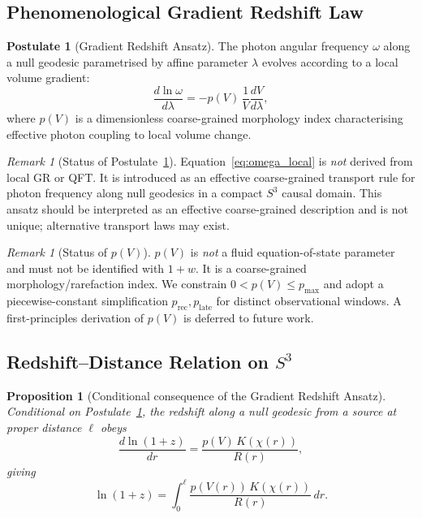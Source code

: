 \documentclass[12pt,a4paper]{amsart}
\theoremstyle{plain}
\newtheorem{proposition}[theorem]{Proposition}
\theoremstyle{definition}
\newtheorem{postulate}[theorem]{Postulate}
\theoremstyle{remark}
\newtheorem{remark}[theorem]{Remark}
\newcommand{\Sthree}{S^3}
\begin{document}
\subsection{Phenomenological Gradient Redshift Law}

\begin{postulate}[Gradient Redshift Ansatz]
  \label{post:gradient}
  The photon angular frequency $\omega$ along a null geodesic
  parametrised by affine parameter $\lambda$ evolves according to a
  local volume gradient:
  \begin{equation}
    \frac{d\ln\omega}{d\lambda} = -p(V)\,\frac{1}{V}\frac{dV}{d\lambda},
    \label{eq:omega_local}
  \end{equation}
  where $p(V)$ is a dimensionless coarse-grained morphology index
  characterising effective photon coupling to local volume change.
\end{postulate}

\begin{remark}[Status of Postulate~\ref{post:gradient}]
  Equation~\eqref{eq:omega_local} is \emph{not} derived from local
  GR or QFT. It is introduced as an effective coarse-grained transport
  rule for photon frequency along null geodesics in a compact $\Sthree$
  causal domain. This ansatz should be interpreted as an effective
  coarse-grained description and is not unique; alternative transport
  laws may exist.
\end{remark}

\begin{remark}[Status of $p(V)$]
  $p(V)$ is \emph{not} a fluid equation-of-state parameter and must
  not be identified with $1+w$. It is a coarse-grained
  morphology/rarefaction index. We constrain $0<p(V)\leq p_{\max}$
  and adopt a piecewise-constant simplification $p_{\mathrm{rec}},
  p_{\mathrm{late}}$ for distinct observational windows. A
  first-principles derivation of $p(V)$ is deferred to future work.
\end{remark}

\subsection{Redshift--Distance Relation on $\Sthree$}

\begin{proposition}[Conditional consequence of the Gradient Redshift Ansatz]
  \label{thm:redshift}
  \emph{Conditional on Postulate~\ref{post:gradient}}, the redshift
  along a null geodesic from a source at proper distance $\ell$ obeys
  \begin{equation}
    \frac{d\ln(1+z)}{dr} = \frac{p(V)\,K(\chi(r))}{R(r)},
    \label{eq:dlnz}
  \end{equation}
  giving
  \begin{equation}
    \boxed{
      \ln(1+z) = \int_0^\ell \frac{p(V(r))\,K(\chi(r))}{R(r)}\,dr.
    }
    \label{eq:zintegral}
  \end{equation}
\end{proposition}
\end{document}
